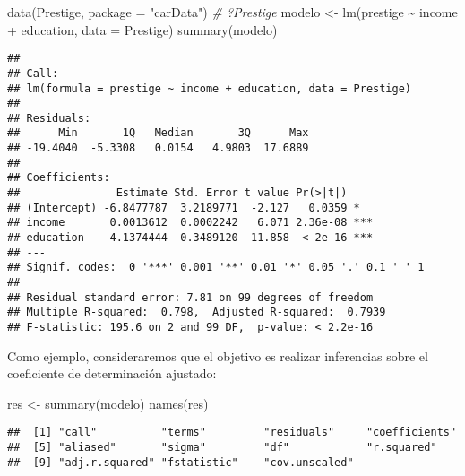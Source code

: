 \documentclass[
]{book}
\newenvironment{Shaded}{\begin{snugshade}}{\end{snugshade}}
\newcommand{\AttributeTok}[1]{\textcolor[rgb]{0.77,0.63,0.00}{#1}}
\newcommand{\CommentTok}[1]{\textcolor[rgb]{0.56,0.35,0.01}{\textit{#1}}}
\newcommand{\FunctionTok}[1]{\textcolor[rgb]{0.00,0.00,0.00}{#1}}
\newcommand{\NormalTok}[1]{#1}
\newcommand{\OtherTok}[1]{\textcolor[rgb]{0.56,0.35,0.01}{#1}}
\newcommand{\SpecialCharTok}[1]{\textcolor[rgb]{0.00,0.00,0.00}{#1}}
\newcommand{\StringTok}[1]{\textcolor[rgb]{0.31,0.60,0.02}{#1}}
\theoremstyle{break}
\theoremstyle{definition}
\theoremstyle{definition}
\theoremstyle{definition}
\theoremstyle{definition}
\theoremstyle{remark}
\begin{document}
\begin{Shaded}
\begin{Highlighting}[]
\FunctionTok{data}\NormalTok{(Prestige, }\AttributeTok{package =} \StringTok{"carData"}\NormalTok{)}
\CommentTok{\# ?Prestige}
\NormalTok{modelo }\OtherTok{\textless{}{-}} \FunctionTok{lm}\NormalTok{(prestige }\SpecialCharTok{\textasciitilde{}}\NormalTok{ income }\SpecialCharTok{+}\NormalTok{ education, }\AttributeTok{data =}\NormalTok{ Prestige)}
\FunctionTok{summary}\NormalTok{(modelo)}
\end{Highlighting}
\end{Shaded}

\begin{verbatim}
## 
## Call:
## lm(formula = prestige ~ income + education, data = Prestige)
## 
## Residuals:
##      Min       1Q   Median       3Q      Max 
## -19.4040  -5.3308   0.0154   4.9803  17.6889 
## 
## Coefficients:
##               Estimate Std. Error t value Pr(>|t|)    
## (Intercept) -6.8477787  3.2189771  -2.127   0.0359 *  
## income       0.0013612  0.0002242   6.071 2.36e-08 ***
## education    4.1374444  0.3489120  11.858  < 2e-16 ***
## ---
## Signif. codes:  0 '***' 0.001 '**' 0.01 '*' 0.05 '.' 0.1 ' ' 1
## 
## Residual standard error: 7.81 on 99 degrees of freedom
## Multiple R-squared:  0.798,  Adjusted R-squared:  0.7939 
## F-statistic: 195.6 on 2 and 99 DF,  p-value: < 2.2e-16
\end{verbatim}

Como ejemplo, consideraremos que el objetivo es realizar inferencias sobre el coeficiente de determinación ajustado:

\begin{Shaded}
\begin{Highlighting}[]
\NormalTok{res }\OtherTok{\textless{}{-}} \FunctionTok{summary}\NormalTok{(modelo)}
\FunctionTok{names}\NormalTok{(res)}
\end{Highlighting}
\end{Shaded}

\begin{verbatim}
##  [1] "call"          "terms"         "residuals"     "coefficients" 
##  [5] "aliased"       "sigma"         "df"            "r.squared"    
##  [9] "adj.r.squared" "fstatistic"    "cov.unscaled"
\end{verbatim}

\begin{Shaded}
\end{Shaded}
\end{document}

